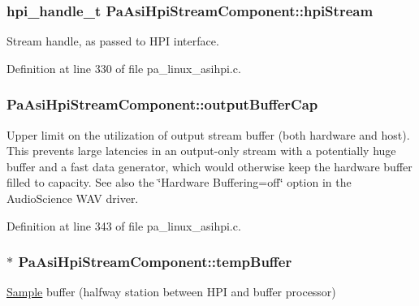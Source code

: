 \subsubsection[{\texorpdfstring{hpi\+Stream}{hpiStream}}]{\setlength{\rightskip}{0pt plus 5cm}hpi\+\_\+handle\+\_\+t Pa\+Asi\+Hpi\+Stream\+Component\+::hpi\+Stream}\hypertarget{struct_pa_asi_hpi_stream_component_adb013f749ef39f2757a89ac73ec4d1fd}{}\label{struct_pa_asi_hpi_stream_component_adb013f749ef39f2757a89ac73ec4d1fd}
Stream handle, as passed to H\+PI interface. 

Definition at line 330 of file pa\+\_\+linux\+\_\+asihpi.\+c.

\subsubsection[{\texorpdfstring{output\+Buffer\+Cap}{outputBufferCap}}]{ Pa\+Asi\+Hpi\+Stream\+Component\+::output\+Buffer\+Cap}\hypertarget{struct_pa_asi_hpi_stream_component_aee16a4bcc8580a966c64bbac57c0611c}{}\label{struct_pa_asi_hpi_stream_component_aee16a4bcc8580a966c64bbac57c0611c}
Upper limit on the utilization of output stream buffer (both hardware and host). This prevents large latencies in an output-\/only stream with a potentially huge buffer and a fast data generator, which would otherwise keep the hardware buffer filled to capacity. See also the \char`\"{}\+Hardware Buffering=off\char`\"{} option in the Audio\+Science W\+AV driver. 

Definition at line 343 of file pa\+\_\+linux\+\_\+asihpi.\+c.

\subsubsection[{\texorpdfstring{temp\+Buffer}{tempBuffer}}]{$\ast$ Pa\+Asi\+Hpi\+Stream\+Component\+::temp\+Buffer}\hypertarget{struct_pa_asi_hpi_stream_component_a2a6fb26a57106d7c62f63578d38437b9}{}\label{struct_pa_asi_hpi_stream_component_a2a6fb26a57106d7c62f63578d38437b9}
\hyperlink{struct_sample}{Sample} buffer (halfway station between H\+PI and buffer processor) 

